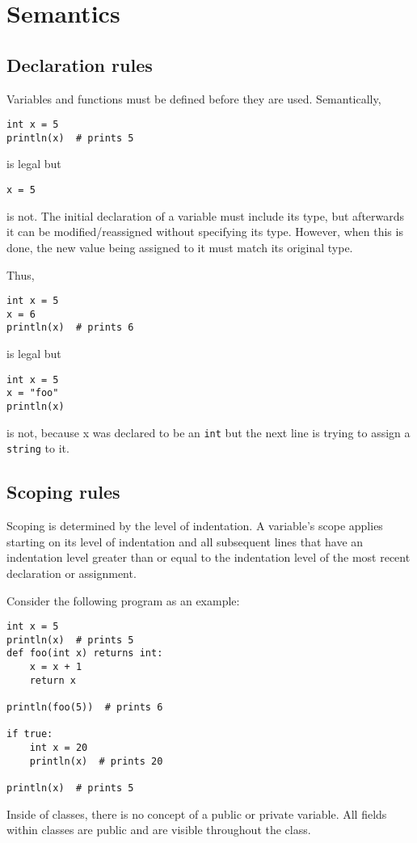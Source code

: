 \documentclass{article}
\begin{document}
\section{Semantics}
\subsection{Declaration rules}
Variables and functions must be defined before they are used. Semantically,
\begin{verbatim}
int x = 5
println(x)  # prints 5
\end{verbatim}
is legal but 
\begin{verbatim}
x = 5
\end{verbatim}
is not. The initial declaration of a variable must include its type, but afterwards it can be modified/reassigned without specifying its type. However, when this is done, the new value being assigned to it must match its original type.

Thus,
\begin{verbatim}
int x = 5
x = 6
println(x)  # prints 6
\end{verbatim}
is legal but
\begin{verbatim}
int x = 5
x = "foo"
println(x)
\end{verbatim}
is not, because x was declared to be an \texttt{int} but the next line is trying to assign a \texttt{string} to it.

\subsection{Scoping rules}
Scoping is determined by the level of indentation. A variable's scope applies starting on its level of indentation and all subsequent lines that have an indentation level greater than or equal to the indentation level of the most recent declaration or assignment.

Consider the following program as an example:

\begin{verbatim}
int x = 5
println(x)  # prints 5
def foo(int x) returns int:
    x = x + 1
    return x

println(foo(5))  # prints 6

if true:
    int x = 20
    println(x)  # prints 20
    
println(x)  # prints 5
\end{verbatim}

Inside of classes, there is no concept of a public or private variable. All fields within classes are public and are visible throughout the class.
\end{document}
